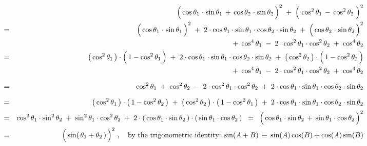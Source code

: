 	\begin{eqnarray*}
	&&
		\left(\,
			\cos\theta_{1}\overset{{\color{white}1}}{\cdot}\sin\theta_{1}
			\, + \,
			\cos\theta_{2}\overset{{\color{white}1}}{\cdot}\sin\theta_{2}
			\,\right)^{2}
		\; + \;
		\left(\; \cos^{2}\theta_{1} \, \overset{{\color{white}.}}{-} \, \cos^{2}\theta_{2} \;\right)^{2}
	\\
	& = &
		\left(\, \cos\theta_{1}\overset{{\color{white}1}}{\cdot}\sin\theta_{1} \,\right)^{2}
		\; + \;
		2 \cdot \cos\theta_{1} \cdot \sin\theta_{1} \cdot \cos\theta_{2} \cdot \sin\theta_{2}
		\; + \;
		\left(\, \cos\theta_{2}\overset{{\color{white}1}}{\cdot}\sin\theta_{2} \,\right)^{2}
	\\
	& &
		\; + \;
		\cos^{4}\theta_{1}
		\; - \;
		2 \cdot \cos^{2}\theta_{1} \cdot \cos^{2}\theta_{2}
		\; + \;
		\cos^{4}\theta_{2}
	\\
	& = &
		\left(\, \cos^{2}\theta_{1} \,\right)
		\cdot
		\left(\, 1\overset{{\color{white}.}}{-}\cos^{2}\theta_{1} \,\right)
		\; + \;
		2 \cdot \cos\theta_{1} \cdot \sin\theta_{1} \cdot \cos\theta_{2} \cdot \sin\theta_{2}
		\; + \;
		\left(\, \cos^{2}\theta_{2} \,\right)
		\cdot
		\left(\, 1\overset{{\color{white}.}}{-}\cos^{2}\theta_{2} \,\right)
	\\
	& &
		\; + \;
		\cos^{4}\theta_{1}
		\; - \;
		2 \cdot \cos^{2}\theta_{1} \cdot \cos^{2}\theta_{2}
		\; + \;
		\cos^{4}\theta_{2}
	\\
	& \overset{{\color{white}\textnormal{\large1}}}{=} &
		\cos^{2}\theta_{1}
		\; + \;
		\cos^{2}\theta_{2}
		\; - \;
		2 \cdot \cos^{2}\theta_{1} \cdot \cos^{2}\theta_{2}
		\; + \;
		2 \cdot \cos\theta_{1} \cdot \sin\theta_{1} \cdot \cos\theta_{2} \cdot \sin\theta_{2}
	\\
	& \overset{{\color{white}\textnormal{\large1}}}{=} &
		\left(\,\cos^{2}\theta_{1}\,\right) \cdot \left(\,1 - \cos^{2}\theta_{2}\,\right)
		\; + \;
		\left(\,\cos^{2}\theta_{2}\,\right) \cdot \left(\,1 - \cos^{2}\theta_{1}\,\right)
		\; + \;
		2 \cdot \cos\theta_{1} \cdot \sin\theta_{1} \cdot \cos\theta_{2} \cdot \sin\theta_{2}
	\\
	& \overset{{\color{white}\textnormal{\large1}}}{=} &
		\cos^{2}\theta_{1} \cdot \sin^{2}\theta_{2}
		\; + \;
		\sin^{2}\theta_{1} \cdot \cos^{2}\theta_{2}
		\; + \;
		2 \cdot \left(\,\cos\theta_{1} \cdot \sin\theta_{2} \,\right) \cdot \left(\,\sin\theta_{1} \cdot \cos\theta_{2} \,\right)
	\;\; = \;\;
		\left(\,\cos\theta_{1} \cdot \sin\theta_{2} \,\overset{{\color{white}.}}{+}\, \sin\theta_{1} \cdot \cos\theta_{2} \,\right)^{2}
	\\
	& = &
		\left(\,\sin(\,\theta_{1} \overset{{\color{white}.}}{+} \theta_{2}\,) \,\right)^{2}\,,
		\quad
		\textnormal{by the trigonometric identity: $\sin(A+B) \,\equiv\, \sin(A) \cos(B) + \cos(A) \sin(B)$}
	\end{eqnarray*}
